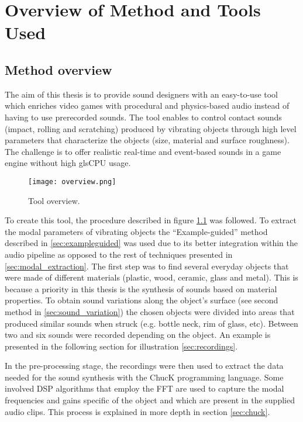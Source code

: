\chapter{Overview of Method and Tools Used}\label{ch:method}

\section{Method overview}
The aim of this thesis is to provide sound designers with an easy-to-use tool which enriches video games with procedural and physics-based audio instead of having to use prerecorded sounds. The tool enables to control contact sounds (impact, rolling and scratching) produced by vibrating objects through high level parameters that characterize the objects (size, material and surface roughness). The challenge is to offer realistic real-time and event-based sounds in a game engine without high gls{CPU} usage.

\begin{figure}[H]
  \centering
    \texttt{[image: overview.png]}
      \caption{Tool overview.}
      \label{fig:synth_proc}
\end{figure}

To create this tool, the procedure described in figure \ref{fig:synth_proc} was followed. To extract the modal parameters of vibrating objects the ``Example-guided'' method described in \ref{sec:exampleguided} was used due to its better integration within the audio pipeline as opposed to the rest of techniques presented in \ref{sec:modal_extraction}. The first step was to find several everyday objects that were made of different materials (plastic, wood, ceramic, glass and metal). This is because a priority in this thesis is the synthesis of sounds based on material properties. To obtain sound variations along the object's surface (see second method in \ref{sec:sound_variation}) the chosen objects were divided into areas that produced similar sounds when struck (e.g. bottle neck, rim of glass, etc). Between two and six sounds were recorded depending on the object. An example is presented in the following section for illustration \ref{sec:recordings}.

In the pre-processing stage, the recordings were then used to extract the data needed for the sound synthesis with the ChucK programming language. Some involved \gls{DSP} algorithms that employ the \gls{FFT} are used to capture the modal frequencies and gains specific of the object and which are present in the supplied audio clips. This process is explained in more depth in section \ref{sec:chuck}. 

